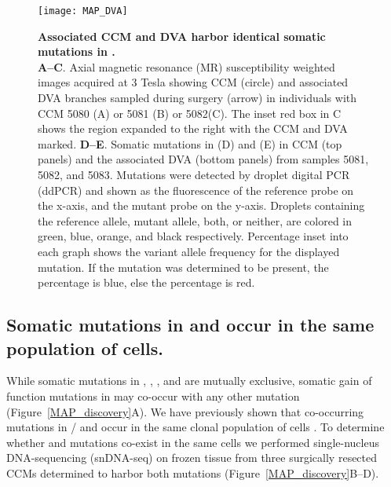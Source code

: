 \begin{figure}[!ht]
\centering
\texttt{[image: MAP\_DVA]}
\caption{\textbf{Associated CCM and DVA harbor identical somatic mutations in .\\}
\textbf{A--C}. Axial magnetic resonance (MR) susceptibility weighted images acquired at 3 Tesla showing CCM (circle) and associated DVA branches sampled during surgery (arrow) in individuals with CCM 5080 (A) or 5081 (B) or 5082(C). The inset red box in C shows the region expanded to the right with the CCM and DVA marked. \textbf{D--E}. Somatic mutations in  (D) and  (E) in CCM (top panels) and the associated DVA (bottom panels) from samples 5081, 5082, and 5083. Mutations were detected by droplet digital PCR (ddPCR) and shown as the fluorescence of the reference probe on the x-axis, and the mutant probe on the y-axis. Droplets containing the reference allele, mutant allele, both, or neither, are colored in green, blue, orange, and black respectively. Percentage inset into each graph shows the variant allele frequency for the displayed mutation. If the mutation was determined to be present, the percentage is blue, else the percentage is red.}

\label{MAP_DVA}
\end{figure}

\subsection{Somatic mutations in  and  occur in the same population of cells. }

While somatic mutations in , , , and  are mutually exclusive, somatic gain of function mutations in  may co-occur with any other mutation (Figure~\ref{MAP_discovery}A). We have previously shown that co-occurring mutations in / and  occur in the same clonal population of cells \citep{ren2021}. To determine whether  and  mutations co-exist in the same cells we performed single-nucleus DNA-sequencing (snDNA-seq) on frozen tissue from three surgically resected CCMs determined to harbor both mutations (Figure~\ref{MAP_discovery}B--D). 

